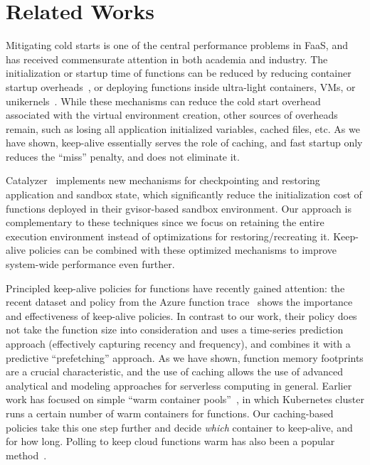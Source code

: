 \section{Related Works}
\label{sec:faascache-related}


Mitigating cold starts is one of the central performance problems in FaaS, and has received commensurate attention in both academia and industry.
%
The initialization or startup time of functions can be reduced  by reducing container startup overheads~\cite{oakes_sock_2018,mohan_agile_2019, akkus_sand_2018}, or deploying functions inside ultra-light containers, VMs, or unikernels~\cite{unikernels,firecracker-nsdi20}.
%
While these mechanisms can reduce the cold start overhead associated with the virtual environment creation, other sources of overheads remain, such as losing all application initialized variables, cached files, etc.
As we have shown, keep-alive essentially serves the role of caching, and fast startup only reduces the ``miss'' penalty, and does not eliminate it.

Catalyzer~\cite{du2020catalyzer} implements new mechanisms for checkpointing and restoring application and sandbox state, which significantly reduce the initialization cost of functions deployed in their gvisor-based sandbox environment. 
Our approach is complementary to these techniques since we focus on retaining the entire execution environment instead of optimizations for restoring/recreating it. 
Keep-alive policies can be combined with these optimized mechanisms to improve system-wide performance even further. 


Principled keep-alive policies for functions have recently gained attention: the recent dataset and policy from the Azure function trace~\cite{shahrad_serverless_2020} shows the importance and effectiveness of keep-alive policies. 
In contrast to our work, their policy does not take the function size into consideration and uses a time-series prediction approach (effectively capturing recency and frequency), and combines it with a predictive ``prefetching'' approach. 
As we have shown, function memory footprints are a crucial characteristic, and the use of caching allows the use of advanced analytical and modeling approaches for serverless computing in general. 
Earlier work has focused on simple ``warm container pools''~\cite{lin_mitigating_2019}, in which Kubernetes cluster runs a certain number of warm containers for functions. 
Our caching-based policies take this one step further and decide \emph{which} container to keep-alive, and for how long. 
Polling to keep cloud functions warm has also been a popular method~\cite{warm2,warm1}.



